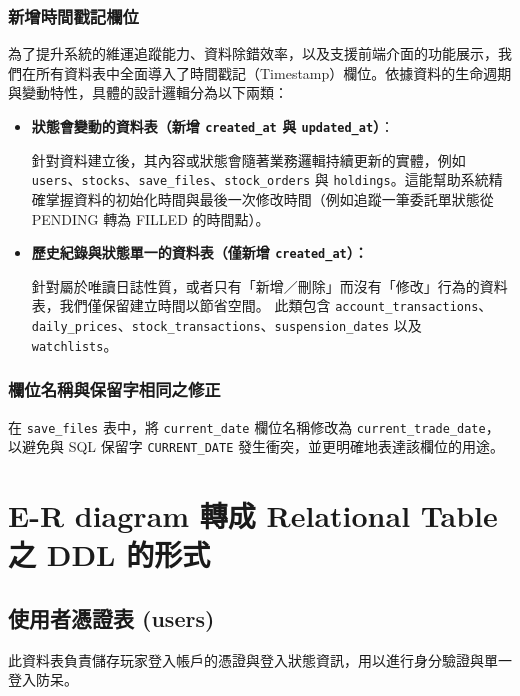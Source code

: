 \documentclass[UTF8, a4paper, 12pt, fontset=none]{ctexart}
\begin{document}
        \subsubsection{新增時間戳記欄位}
        為了提升系統的維運追蹤能力、資料除錯效率，以及支援前端介面的功能展示，我們在所有資料表中全面導入了時間戳記（Timestamp）欄位。依據資料的生命週期與變動特性，具體的設計邏輯分為以下兩類：
        
        \begin{itemize}
            \item \textbf{狀態會變動的資料表（新增 \texttt{created\_at} 與 \texttt{updated\_at}）}：
            
            針對資料建立後，其內容或狀態會隨著業務邏輯持續更新的實體，例如 \verb|users|、\verb|stocks|、\verb|save_files|、\verb|stock_orders| 與 \verb|holdings|。這能幫助系統精確掌握資料的初始化時間與最後一次修改時間（例如追蹤一筆委託單狀態從 PENDING 轉為 FILLED 的時間點）。
            
            \item \textbf{歷史紀錄與狀態單一的資料表（僅新增 \texttt{created\_at}）：}
            
            針對屬於唯讀日誌性質，或者只有「新增／刪除」而沒有「修改」行為的資料表，我們僅保留建立時間以節省空間。
            此類包含 \verb|account_transactions|、\verb|daily_prices|、\verb|stock_transactions|、\verb|suspension_dates| 以及 \verb|watchlists|。
            
        \end{itemize}
        \subsubsection{欄位名稱與保留字相同之修正}
        在 \verb|save_files| 表中，將 \verb|current_date| 欄位名稱修改為 \verb|current_trade_date|，以避免與 SQL 保留字 \verb|CURRENT_DATE| 發生衝突，並更明確地表達該欄位的用途。
    \section{E-R diagram 轉成 Relational Table 之 DDL 的形式}
    \subsection{使用者憑證表 (users)}
    

    此資料表負責儲存玩家登入帳戶的憑證與登入狀態資訊，用以進行身分驗證與單一登入防呆。
\end{document}
